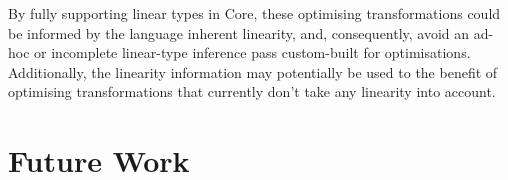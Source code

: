 \documentclass[acmsmall, screen, review]{acmart}
\newcommand{\parawith}[1]{\paragraph{\emph{#1}}}
\begin{document}
By fully supporting linear types in Core, these optimising transformations
could be informed by the language inherent linearity, and, consequently, avoid
an ad-hoc or incomplete linear-type inference pass custom-built for
optimisations. Additionally, the linearity information may potentially be used
to the benefit of optimising transformations that currently don't take any
linearity into account.


% 

% 

\section{Future Work\label{sec:future-work}}
\end{document}
